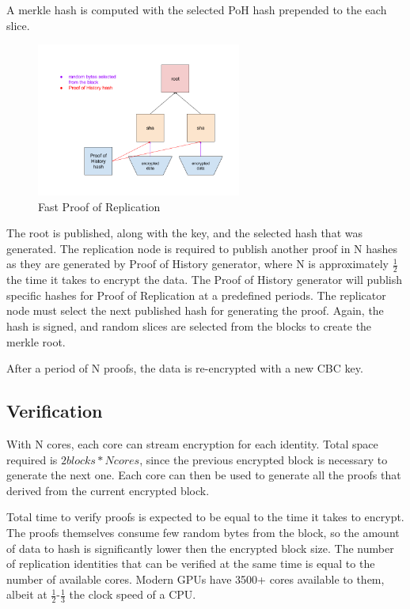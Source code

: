 \documentclass[12pt]{ltjsarticle}
\begin{document}
A merkle hash is computed with the selected PoH hash prepended to the each slice.

\begin{figure}
  \begin{center}
    \centering
    \includegraphics[width=0.6\textwidth]{../../figures/fig_8.png}
    \caption[Fig 8]{Fast Proof of Replication\label{fig_8}}
  \end{center}
  \end{figure}

The root is published, along with the key, and the selected hash that was generated. The replication node is required to publish another proof in N hashes as they are generated by Proof of History generator, where N is approximately \(\frac{1}{2}\) the time it takes to encrypt the data. The Proof of History generator will publish specific hashes for Proof of Replication at a predefined periods. The replicator node must select the next published hash for generating the proof. Again, the hash is signed, and random slices are selected from the blocks to create the merkle root.

After a period of N proofs, the data is re-encrypted with a new CBC key.
\subsection{Verification}

With N cores, each core can stream encryption for each identity. Total space required is \(2 blocks * N cores\), since the previous encrypted block is necessary to generate the next one. Each core can then be used to generate all the proofs that derived from the current encrypted block.

Total time to verify proofs is expected to be equal to the time it takes to encrypt. The proofs themselves consume few random bytes from the block, so the amount of data to hash is significantly lower then the encrypted block size. The number of replication identities that can be verified at the same time is equal to the number of available cores. Modern GPUs have 3500+ cores available to them, albeit at \(\frac{1}{2}\)-\(\frac{1}{3}\) the clock speed of a CPU.
\end{document}
